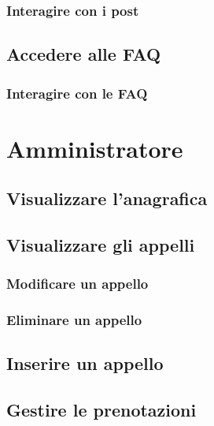 \documentclass [a4paper,11pt]{book}
\begin{document}
\subsubsection{Interagire con i post}

\medskip

\subsection{Accedere alle FAQ}


\subsubsection{Interagire con le FAQ}

\medskip
\medskip

\section{Amministratore}

\subsection{Visualizzare l'anagrafica}

\medskip

\subsection{Visualizzare gli appelli}


\subsubsection{Modificare un appello}

\medskip

\subsubsection{Eliminare un appello}

\medskip

\subsection{Inserire un appello}


\medskip

\subsection{Gestire le prenotazioni}
\end{document}
